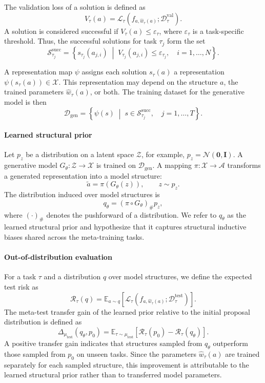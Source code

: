 The validation loss of a solution is defined as
$$
V_\tau(a)
=
\mathcal{L}_\tau
\left(
f_{a,\widehat{w}_\tau(a)};
\mathcal{D}^{\mathrm{val}}_\tau
\right).
$$
A solution is considered successful if
$V_\tau(a)\leq\varepsilon_\tau$, where $\varepsilon_\tau$ is a
task-specific threshold. Thus, the successful solutions for task $\tau_j$
form the set
$$
\mathcal{S}^{\mathrm{succ}}_{\tau_j}
=
\left\{
s_{\tau_j}(a_{j,i})
\;\middle|\;
V_{\tau_j}(a_{j,i})\leq\varepsilon_{\tau_j},
\quad i=1,\ldots,N
\right\}.
$$

A representation map $\psi$ assigns each solution $s_\tau(a)$ a
representation $\psi(s_\tau(a))\in\mathcal{X}$. This representation may
depend on the structure $a$, the trained parameters
$\widehat{w}_\tau(a)$, or both. The training dataset for the generative model
is then
$$
\mathcal{D}_{\mathrm{gen}}
=
\left\{
\psi(s)
\;\middle|\;
s\in\mathcal{S}^{\mathrm{succ}}_{\tau_j},
\quad j=1,\ldots,T
\right\}.
$$

\paragraph*{Learned structural prior}

Let $p_z$ be a distribution on a latent space $\mathcal{Z}$, for example,
$p_z=\mathcal{N}(\mathbf{0},\mathbf{I})$. A generative model
$G_\theta:\mathcal{Z}\rightarrow\mathcal{X}$ is trained on
$\mathcal{D}_{\mathrm{gen}}$. A mapping
$\pi:\mathcal{X}\rightarrow\mathcal{A}$ transforms a generated
representation into a model structure:
$$
\widetilde{a}
=
\pi\left(G_\theta(z)\right),
\qquad
z\sim p_z.
$$
The distribution induced over model structures is
$$
q_\theta
=
\left(\pi\circ G_\theta\right)_{\#}p_z,
$$
where $(\cdot)_{\#}$ denotes the pushforward of a distribution. We refer to
$q_\theta$ as the learned structural prior and hypothesize that it captures
structural inductive biases shared across the meta-training tasks.

\paragraph*{Out-of-distribution evaluation}

For a task $\tau$ and a distribution $q$ over model structures, we define
the expected test risk as
$$
\mathcal{R}_\tau(q)
=
\mathbb{E}_{a\sim q}
\left[
\mathcal{L}_\tau
\left(
f_{a,\widehat{w}_\tau(a)};
\mathcal{D}^{\mathrm{test}}_\tau
\right)
\right].
$$
The meta-test transfer gain of the learned prior relative to the initial
proposal distribution is defined as
$$
\Delta_{\mu_{\mathrm{test}}}(q_\theta,p_0)
=
\mathbb{E}_{\tau\sim\mu_{\mathrm{test}}}
\left[
\mathcal{R}_\tau(p_0)
-
\mathcal{R}_\tau(q_\theta)
\right].
$$
A positive transfer gain indicates that structures sampled from
$q_\theta$ outperform those sampled from $p_0$ on unseen tasks. Since the
parameters $\widehat{w}_\tau(a)$ are trained separately for each sampled
structure, this improvement is attributable to the learned structural prior
rather than to transferred model parameters.
